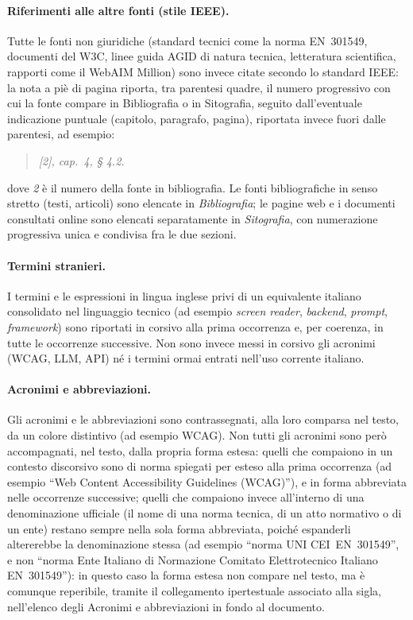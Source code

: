\paragraph*{Riferimenti alle altre fonti (stile IEEE).} Tutte le fonti non giuridiche (standard tecnici come la norma EN~301549, documenti del W3C, linee guida AGID di natura tecnica, letteratura scientifica, rapporti come il WebAIM Million) sono invece citate secondo lo standard IEEE: la nota a piè di pagina riporta, tra parentesi quadre, il numero progressivo con cui la fonte compare in Bibliografia o in Sitografia, seguito dall'eventuale indicazione puntuale (capitolo, paragrafo, pagina), riportata invece fuori dalle parentesi, ad esempio:
\begin{quote}
\itshape [2], cap.~4, § 4.2.
\end{quote}
dove \emph{2} è il numero della fonte in bibliografia. Le fonti bibliografiche in senso stretto (testi, articoli) sono elencate in \emph{Bibliografia}; le pagine web e i documenti consultati online sono elencati separatamente in \emph{Sitografia}, con numerazione progressiva unica e condivisa fra le due sezioni.

\paragraph*{Termini stranieri.} I termini e le espressioni in lingua inglese privi di un equivalente italiano consolidato nel linguaggio tecnico (ad esempio \emph{screen reader}, \emph{backend}, \emph{prompt}, \emph{framework}) sono riportati in corsivo alla prima occorrenza e, per coerenza, in tutte le occorrenze successive. Non sono invece messi in corsivo gli acronimi (WCAG, LLM, API) né i termini ormai entrati nell'uso corrente italiano.

\paragraph*{Acronimi e abbreviazioni.} Gli acronimi e le abbreviazioni sono contrassegnati, alla loro comparsa nel testo, da un colore distintivo (ad esempio \textcolor{acronymColor}{WCAG}). Non tutti gli acronimi sono però accompagnati, nel testo, dalla propria forma estesa: quelli che compaiono in un contesto discorsivo sono di norma spiegati per esteso alla prima occorrenza (ad esempio \enquote{Web Content Accessibility Guidelines (WCAG)}), e in forma abbreviata nelle occorrenze successive; quelli che compaiono invece all'interno di una denominazione ufficiale (il nome di una norma tecnica, di un atto normativo o di un ente) restano sempre nella sola forma abbreviata, poiché espanderli altererebbe la denominazione stessa (ad esempio \enquote{norma \textcolor{acronymColor}{UNI} \textcolor{acronymColor}{CEI}~EN~301549}, e non \enquote{norma Ente Italiano di Normazione Comitato Elettrotecnico Italiano EN~301549}): in questo caso la forma estesa non compare nel testo, ma è comunque reperibile, tramite il collegamento ipertestuale associato alla sigla, nell'elenco degli Acronimi e abbreviazioni in fondo al documento.
 

